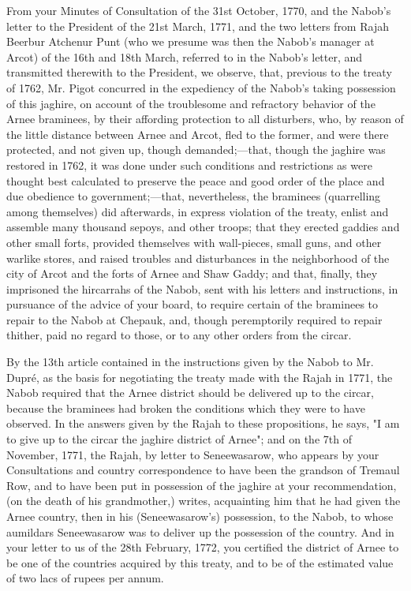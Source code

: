 From your Minutes of Consultation of the 31st October, 1770, and the Nabob's letter to the President of the 21st March, 1771, and the two letters from Rajah Beerbur Atchenur Punt (who we presume was then the Nabob's manager at Arcot) of the 16th and 18th March, referred to in the Nabob's letter, and transmitted therewith to the President, we observe, that, previous to the treaty of 1762, Mr. Pigot concurred in the expediency of the Nabob's taking possession of this jaghire, on account of the troublesome and refractory behavior of the Arnee braminees, by their affording protection to all disturbers, who, by reason of the little distance between Arnee and Arcot, fled to the former, and were there protected, and not given up, though demanded;—that, though the jaghire was restored in 1762, it was done under such conditions and restrictions as were thought best calculated to preserve the peace and good order of the place and due obedience to government;—that, nevertheless, the braminees (quarrelling among themselves) did afterwards, in express violation of the treaty, enlist and assemble many thousand sepoys, and other troops; that they erected gaddies and other small forts, provided themselves with wall-pieces, small guns, and other warlike stores, and raised troubles and disturbances in the neighborhood of the city of Arcot and the forts of Arnee and Shaw Gaddy; and that, finally, they imprisoned the hircarrahs of the Nabob, sent with his letters and instructions, in pursuance of the advice of your board, to require certain of the braminees to repair to the Nabob at Chepauk, and, though peremptorily required to repair thither, paid no regard to those, or to any other orders from the circar.

By the 13th article contained in the instructions given by the Nabob to Mr. Dupré, as the basis for negotiating the treaty made with the Rajah in 1771, the Nabob required that the Arnee district should be delivered up to the circar, because the braminees had broken the conditions which they were to have observed. In the answers given by the Rajah to these propositions, he says, "I am to give up to the circar the jaghire district of Arnee"; and on the 7th of November, 1771, the Rajah, by letter to Seneewasarow, who appears by your Consultations and country correspondence to have been the grandson of Tremaul Row, and to have been put in possession of the jaghire at your recommendation, (on the death of his grandmother,) writes, acquainting him that he had given the Arnee country, then in his (Seneewasarow's) possession, to the Nabob, to whose aumildars Seneewasarow was to deliver up the possession of the country. And in your letter to us of the 28th February, 1772, you certified the district of Arnee to be one of the countries acquired by this treaty, and to be of the estimated value of two lacs of rupees per annum.

